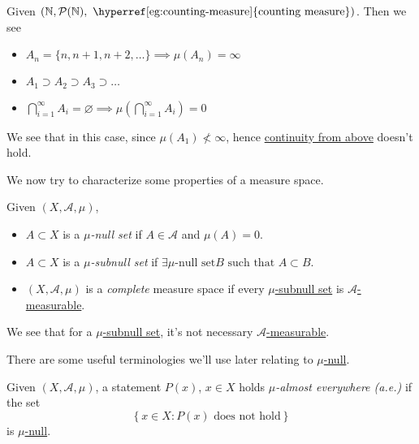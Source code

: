 \begin{eg}
	Given \(\left(\mathbb{\MakeUppercase{N}}, \mathcal{P} (\mathbb{\MakeUppercase{N}}), \text{ \hyperref[eg:counting-measure]{counting measure}}\right)\). Then we see
	\begin{itemize}
		\item \(A_{n} = \{n, n+1, n+2, \ldots  \} \implies \mu(A_{n}) = \infty \)
		\item \(A_1 \supset A_2\supset A_3\supset \ldots  \)
		\item \(\bigcap\limits_{i=1}^{\infty} A_{i} = \varnothing \implies \mu\left(\bigcap\limits_{i=1}^{\infty} A_{i}\right) = 0\)
	\end{itemize}
	\begin{remark}
		We see that in this case, since \(\mu(A_1)\nless \infty \), hence \hyperref[thm:measure-space-continuity-from-above]{continuity from above} doesn't hold.
	\end{remark}
\end{eg}

We now try to characterize some properties of a measure space.
\begin{definition}
	Given \((X, \mathcal{A} , \mu)\),
	\begin{itemize}
		\item\label{def:mu-null-set} \(A\subset X\) is a \emph{\(\mu\)-null set} if \(A\in \mathcal{A} \) and \(\mu(A) = 0\).
		\item\label{def:mu-subnull-set} \(A\subset X\) is a \emph{\(\mu\)-subnull set} if \(\exists \hyperref[def:mu-null-set]{\mu\text{-null set}} B \text{ such that }A\subset B\).
		\item\label{def:complete-measure-space} \((X, \mathcal{A} , \mu)\) is a \emph{complete} measure space if every \hyperref[def:mu-subnull-set]{\(\mu\)-subnull set} is \hyperref[def:measurable-set]{\(\mathcal{A}\)-measurable}.
	\end{itemize}
\end{definition}
\begin{note}
	We see that for a \hyperref[def:mu-subnull-set]{\(\mu\)-subnull set}, it's not necessary \hyperref[def:measurable-set]{\(\mathcal{A}\)-measurable}.
\end{note}

There are some useful terminologies we'll use later relating to \hyperref[def:mu-null-set]{\(\mu\)-null}.
\begin{definition}\label{def:mu-almost-everywhere}
	Given \((X, \mathcal{A} , \mu)\), a statement \(P(x)\), \(x\in X\) holds \emph{\(\mu\)-almost everywhere (a.e.)} if
	the set
	\[
		\left\{x\in X\colon P(x) \text{ does not hold} \right\}
	\]
	is \hyperref[def:mu-null-set]{\(\mu\)-null}.
\end{definition}

